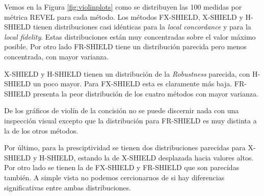 Vemos en la Figura \ref{fig:violinplots} como se distribuyen las 100 medidas por métrica REVEL para cada método. Los métodos FX-SHIELD, X-SHIELD y H-SHIELD tienen distribuciones casi idénticas para la \textit{local concordance} y para la \textit{local fidelity}. Estas distribuciones están muy concentradas sobre el valor máximo posible. Por otro lado FR-SHIELD tiene un distribución parecida pero menos concentrada, con mayor varianza. 

X-SHIELD y H-SHIELD tienen un distribución de la \textit{Robustness} parecida, con H-SHIELD un poco mayor. Para FX-SHIELD esta es claramente más baja. FR-SHIELD presenta la peor distribución de los cuatro métodos con mayor varianza.

De los gráficos de violín de la concisión no se puede discernir nada con una inspección visual excepto que la distribución para FR-SHIELD es muy distinta a la de los otros métodos.

Por último, para la presciptividad se tienen dos distribuciones parecidas para X-SHIELD y H-SHIELD, estando la de X-SHIELD desplazada hacia valores altos. Por otro lado se tienen la de FX-SHIELD y FR-SHIELD que son parecidas también. A simple vista no podemos cercionarnos de si hay diferencias significativas entre ambas distribuciones.


